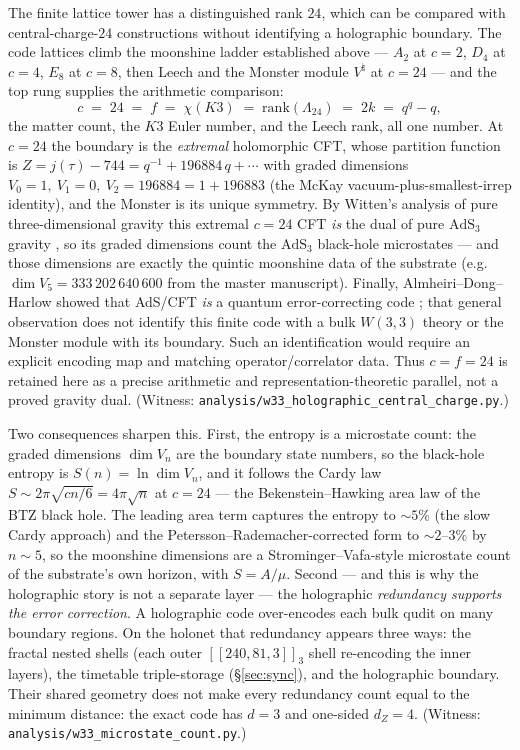 \documentclass[11pt]{article}
\begin{document}
\label{sec:central-charge}

The finite lattice tower has a distinguished rank $24$, which can be compared
with central-charge-$24$ constructions without identifying a holographic
boundary. The code lattices climb the moonshine ladder
established above --- $A_2$ at $c=2$, $D_4$ at $c=4$, $E_8$ at $c=8$,
then Leech and the Monster module $V^{\natural}$ at $c=24$ --- and the top rung
supplies the arithmetic comparison:
\[
  c \;=\; 24 \;=\; f \;=\; \chi(K3) \;=\; \mathrm{rank}(\Lambda_{24})
    \;=\; 2k \;=\; q^q-q ,
\]
the matter count, the $K3$ Euler number, and the Leech rank, all one number. At
$c=24$ the boundary is the \emph{extremal} holomorphic CFT, whose partition
function is $Z=j(\tau)-744=q^{-1}+196884\,q+\cdots$ with graded dimensions
$V_0=1,\ V_1=0,\ V_2=196884=1+196883$ (the McKay vacuum-plus-smallest-irrep
identity), and the Monster is its unique symmetry. By Witten's analysis of pure
three-dimensional gravity this extremal $c=24$ CFT \emph{is} the dual of pure
$\mathrm{AdS}_3$ gravity \cite{witten3d}, so its graded dimensions count the
$\mathrm{AdS}_3$ black-hole microstates --- and those dimensions are exactly the
quintic moonshine data of the substrate (e.g.\ $\dim V_5=333\,202\,640\,600$ from
the master manuscript). Finally, Almheiri--Dong--Harlow showed that AdS/CFT
\emph{is} a quantum error-correcting code \cite{adh}; that general observation
does not identify this finite code with a bulk $W(3,3)$ theory or the Monster
module with its boundary.  Such an identification would require an explicit
encoding map and matching operator/correlator data.  Thus $c=f=24$ is retained
here as a precise arithmetic and representation-theoretic parallel, not a
proved gravity dual. (Witness:
\texttt{analysis/w33\_holographic\_central\_charge.py}.)

Two consequences sharpen this. First, the entropy is a microstate count: the
graded dimensions $\dim V_n$ are the boundary state numbers, so the black-hole
entropy is $S(n)=\ln\dim V_n$, and it follows the Cardy law
$S\sim 2\pi\sqrt{cn/6}=4\pi\sqrt n$ at $c=24$ --- the Bekenstein--Hawking area law
of the BTZ black hole. The leading area term captures the entropy to $\sim5\%$
(the slow Cardy approach) and the Petersson--Rademacher-corrected form to
$\sim2$--$3\%$ by $n\!\sim\!5$, so the moonshine dimensions are a
Strominger--Vafa-style microstate count of the substrate's own horizon, with
$S=A/\mu$. Second --- and this is why the holographic story is not a separate
layer --- the holographic \emph{redundancy supports the error correction}. A
holographic code over-encodes each bulk qudit on many boundary regions.  On the
holonet that redundancy appears three ways: the fractal nested shells (each outer
$[[240,81,3]]_3$ shell re-encoding the inner layers), the timetable
triple-storage (\S\ref{sec:sync}), and the holographic boundary.  Their shared
geometry does not make every redundancy count equal to the minimum distance:
the exact code has $d=3$ and one-sided $d_Z=4$. (Witness:
\texttt{analysis/w33\_microstate\_count.py}.)
\end{document}
